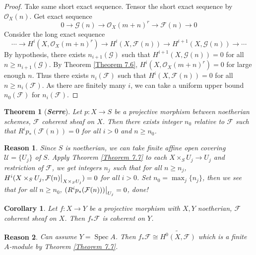 \documentclass{ctexart}
\newtheorem{theorem}{Theorem}[section]
\newtheorem{reason}{Reason}[section]
\newtheorem{corollary}{Corollary}[section]
\newcommand{\spec}{\operatorname{Spec}}
\begin{document}
\begin{proof}
    Take same short exact sequence.
    Tensor the short exact sequence by $\mathcal{O}_{X}(n)$.
    Get exact sequence
    \begin{equation*}
        0 \longrightarrow \mathcal{G}(n) \longrightarrow \mathcal{O}_{X}(m + n)^{r} \longrightarrow \mathcal{F}(n) \longrightarrow 0
    \end{equation*}
    Consider the long exact sequence
    \begin{equation*}
        \cdots \longrightarrow H^{i}(X, \mathcal{O}_{X}(m + n)^{r}) \longrightarrow H^{i}(X, \mathcal{F}(n)) \longrightarrow H^{i + 1}(X, \mathcal{G}(n)) \longrightarrow \cdots
    \end{equation*}
    By hypothesis, there exists $n_{i + 1}(\mathcal{G})$ such that $H^{i + 1}(X, \mathcal{G}(n)) = 0$ for all $n \ge n_{i + 1}(\mathcal{G})$.
    By Theorem \ref{Theorem 7.6}, $H^{i}(X, \mathcal{O}_{X}(m + n)^{r}) = 0$ for large enough $n$.
    Thus there exists $n_{i}(\mathcal{F})$ such that $H^{i}(X, \mathcal{F}(n)) = 0$ for all $n \ge n_{i}(\mathcal{F})$.
    As there are finitely many $i$, we can take a uniform upper bound $n_{0}(\mathcal{F})$ for $n_{i}(\mathcal{F})$.
\end{proof}
\begin{theorem}[\textbf{\emph{Serre}}]
    Let $p: X \rightarrow S$ be a projective morphism between noetherian schemes, $\mathcal{F}$ coherent sheaf on $X$.
    Then there exists integer $n_{0}$ relative to $\mathcal{F}$ such that $R^{i}p_{\ast}(\mathcal{F}(n)) = 0$ for all $i > 0$ and $n \ge n_{0}$.
    \label{Theorem 7.8}
\end{theorem}
\begin{reason}
    Since $S$ is noetherian, we can take finite affine open covering $\mathcal{U} = \{U_{j}\}$ of $S$.
    Apply Theorem \ref{Theorem 7.7} to each $X \times_{S} U_{j} \rightarrow U_{j}$ and restriction of $\mathcal{F}$,
    we get integers $n_{j}$ such that for all $n \ge n_{j}$, $H^{i}(X \times_{S} U_{j}, \mathcal{F}(n)\big{|}_{X \times_{S} U_{j}}) = 0$ for all $i > 0$.
    Set $n_{0} = \max_{j} \{n_{j}\}$, then we see that for all $n \ge n_{0}$,
    $(R^{i}p_{\ast}(\mathcal{F}(n)))\big{|}_{U_{j}} = 0$, done! 
\end{reason}
\begin{corollary}
    Let $f: X \longrightarrow Y$ be a projective morphism with $X, Y$ noetherian, $\mathcal{F}$ coherent sheaf on $X$.
    Then $f_{\ast}\mathcal{F}$ is coherent on $Y$.
    \label{Corollary 7.8}
\end{corollary}
\begin{reason}
    Can assume $Y = \spec A$.
    Then $f_{\ast}\mathcal{F} \cong \widetilde{H^{0}(X, \mathcal{F})}$ which is a finite $A$-module by Theorem \ref{Theorem 7.7}.
\end{reason}
\end{document}
